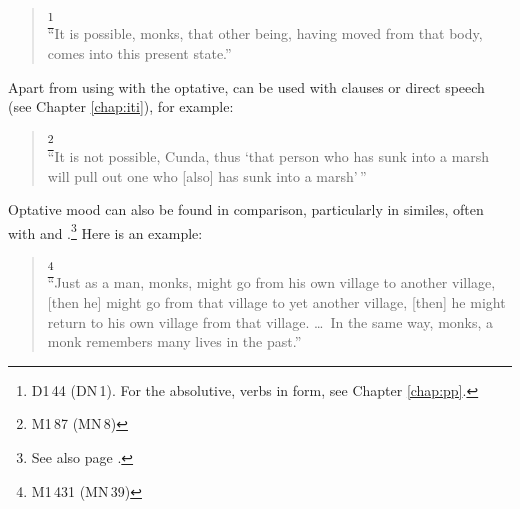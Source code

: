 \begin{quote}
\footnote{D1\,44 (DN\,1). For the absolutive, verbs in  form, see Chapter \ref{chap:pp}.}\\
``It is possible, monks, that other being, having moved from that body, comes into this present state.''\\[1.5mm]
\end{quote}

Apart from using with the optative,  can be used with  clauses or direct speech (see Chapter \ref{chap:iti}), for example:

\begin{quote}
\footnote{M1\,87 (MN\,8)}\\
``It is not possible, Cunda, thus `that person who has sunk into a marsh will pull out one who [also] has sunk into a marsh'\,''\\[1.5mm]
\end{quote}

Optative mood can also be found in comparison, particularly in similes, often with  and .\footnote{See also page \pageref{sec:nip-comparing}.} Here is an example:

\begin{quote}
\footnote{M1\,431 (MN\,39)}\\
``Just as a man, monks, might go from his own village to another village, [then he] might go from that village to yet another village, [then] he might return to his own village from that village. \ldots\ In the same way, monks, a monk remembers many lives in the past.''\\[1.5mm]
\end{quote}

